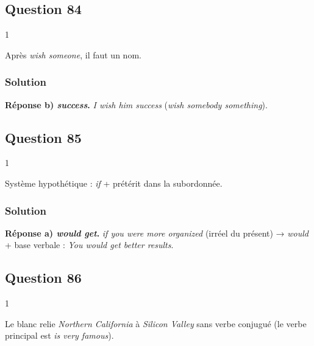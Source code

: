 \documentclass[11pt,a4paper]{article}
\begin{document}
\hypertarget{question-84}{%
\subsection{Question 84}\label{question-84}}

\begin{indication}{1}

Après \emph{wish someone}, il faut un nom.

\end{indication}

\hypertarget{solution-83}{%
\subsubsection{Solution}\label{solution-83}}

\textbf{Réponse b) \emph{success}.} \emph{I wish him success} (\emph{wish somebody something}).

\hypertarget{question-85}{%
\subsection{Question 85}\label{question-85}}

\begin{indication}{1}

Système hypothétique : \emph{if} + prétérit dans la subordonnée.

\end{indication}

\hypertarget{solution-84}{%
\subsubsection{Solution}\label{solution-84}}

\textbf{Réponse a) \emph{would get}.} \emph{if you were more organized} (irréel du présent) → \emph{would} + base verbale : \emph{You would get better results}.

\hypertarget{question-86}{%
\subsection{Question 86}\label{question-86}}

\begin{indication}{1}

Le blanc relie \emph{Northern California} à \emph{Silicon Valley} sans verbe conjugué (le verbe principal est \emph{is very famous}).

\end{indication}
\end{document}

